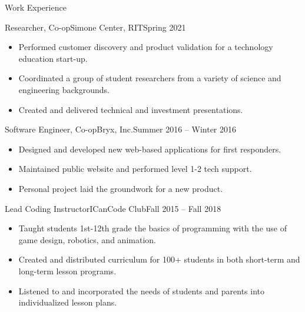 \documentclass[]{mcdowellcv}
\begin{document}
	\makeheader
	
	\begin{cvsection}{Work Experience}
		\begin{cvsubsection}{Researcher, Co-op}{Simone Center, RIT}{Spring 2021}
				
			\begin{itemize}
				\item Performed customer discovery and product validation for a technology education start-up.
				\item Coordinated a group of student researchers from a variety of science and engineering backgrounds.
				\item Created and delivered technical and investment presentations.
			\end{itemize}
		\end{cvsubsection}
		
		\begin{cvsubsection}{Software Engineer, Co-op}{Bryx, Inc.}{Summer 2016 -- Winter 2016}	
			\begin{itemize}
				\item Designed and developed new web-based applications for first responders.
				\item Maintained public website and performed level 1-2 tech support.
				\item Personal project laid the groundwork for a new product.
			\end{itemize}
		\end{cvsubsection}
		
		\begin{cvsubsection}{Lead Coding Instructor}{ICanCode Club}{Fall 2015 -- Fall 2018}		
			\begin{itemize}
				\item Taught students 1st-12th grade the basics of programming with the use of game design, robotics, and animation.
				\item Created and distributed curriculum for 100+ students in both short-term and long-term lesson programs.
				\item Listened to and incorporated the needs of students and parents into individualized lesson plans.
			\end{itemize}
		\end{cvsubsection}	
	\end{cvsection}
	
\end{document}
